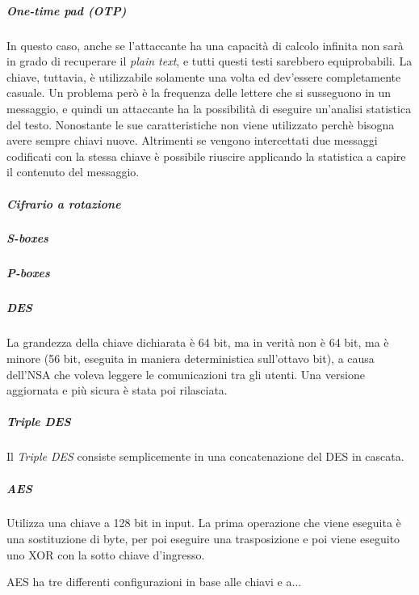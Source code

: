 \subparagraph{One-time pad (OTP)}
In questo caso, anche se l'attaccante ha una capacità di calcolo infinita non 
sarà in grado di recuperare il \textit{plain text}, e tutti questi testi 
sarebbero equiprobabili. La chiave, tuttavia, è utilizzabile solamente una volta 
ed dev'essere completamente casuale.
Un problema però è la frequenza delle lettere che si susseguono in un messaggio, 
e quindi un attaccante ha la possibilità di eseguire un'analisi statistica del 
testo.
Nonostante le sue caratteristiche non viene utilizzato perchè bisogna avere 
sempre chiavi nuove. Altrimenti se vengono intercettati due messaggi codificati 
con la stessa chiave è possibile riuscire applicando la statistica a capire il 
contenuto del messaggio.


\subparagraph{Cifrario a rotazione}


\subparagraph{S-boxes}


\subparagraph{P-boxes}


\subparagraph{DES}


La grandezza della chiave dichiarata è 64 bit, ma in verità non è 64 bit, ma è 
minore (56 bit, eseguita in maniera deterministica sull'ottavo bit), a causa 
dell'NSA che voleva leggere le comunicazioni tra gli utenti. Una versione 
aggiornata e più sicura è stata poi rilasciata.

\subparagraph{Triple DES}

Il \textit{Triple DES} consiste semplicemente in una concatenazione del DES in 
cascata.

\subparagraph{AES}

Utilizza una chiave a 128 bit in input. La prima operazione che viene eseguita è 
una sostituzione di byte, per poi eseguire una trasposizione e poi viene 
eseguito uno XOR con la sotto chiave d'ingresso.


AES ha tre differenti configurazioni in base alle chiavi e a... 

